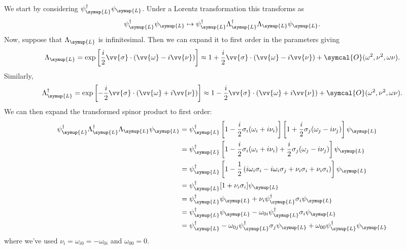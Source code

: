 \documentclass[fleqn]{NotesClass}
\newcommand{\hermit}{\dagger}
\newcommand{\order}{\symcal{O}}
\newcommand{\Left}{\symup{L}}
\begin{document}
    We start by considering \(\psi_{\Left}^\hermit \psi_{\Left}\).
    Under a Lorentz transformation this transforms as
    \begin{equation}
        \psi_{\Left}^\hermit \psi_{\Left} \mapsto \psi_{\Left}^\hermit \Lambda_{\Left}^\hermit \Lambda_{\Left} \psi_{\Left}.
    \end{equation}
    Now, suppose that \(\Lambda_{\Left}\) is infinitesimal.
    Then we can expand it to first order in the parameters giving
    \begin{equation}
        \Lambda_{\Left} = \exp\left[ \frac{i}{2} \vv{\sigma} \cdot (\vv{\omega} - i\vv{\nu}) \right] \approx 1 + \frac{i}{2}\vv{\sigma} \cdot (\vv{\omega} - i \vv{\nu}) + \order(\omega^2, \nu^2, \omega\nu).
    \end{equation}
    Similarly,
    \begin{equation}
        \Lambda_{\Left}^\hermit = \exp\left[ -\frac{i}{2}\vv{\sigma} \cdot (\vv{\omega} + i \vv{\nu}) \right] \approx 1 - \frac{i}{2} \vv{\sigma} \cdot (\vv{\omega} + i \vv{\nu}) + \order(\omega^2, \nu^2, \omega\nu).
    \end{equation}
    We can then expand the transformed spinor product to first order:
    \begin{align}
        \psi_{\Left}^\hermit\Lambda_{\Left}^\hermit \Lambda_{\Left}\psi_{\Left} &= \psi_{\Left}^\hermit \left[ 1 - \frac{i}{2} \sigma_i(\omega_i + i\nu_i) \right] \left[ 1 + \frac{i}{2} \sigma_j(\omega_j - i\nu_j) \right] \psi_{\Left}\\
        &= \psi_{\Left}^\hermit \left[ 1 - \frac{i}{2} \sigma_i (\omega_i + i\nu_i) + \frac{i}{2} \sigma_j (\omega_j - i\nu_j) \right] \psi_{\Left}\\
        &= \psi_{\Left}^\hermit \left[ 1 - \frac{1}{2}\left( i\omega_i\sigma_i - i\omega_i\sigma_j + \nu_i\sigma_i + \nu_i\sigma_i \right) \right] \psi_{\Left}\\
        &= \psi_{\Left}^\hermit [ 1 + \nu_i\sigma_i ] \psi_{\Left}\\
        &= \psi_{\Left}^\hermit \psi_{\Left} + \nu_i \psi_{\Left}^\hermit \sigma_i \psi_{\Left}\\
        &= \psi_{\Left}^\hermit \psi_{\Left} - \omega_{0i}\psi_{\Left}^\hermit\sigma_i\psi_{\Left}\\
        &= \psi_{\Left}^\hermit - \omega_{0j}\psi_{\Left}^\hermit\sigma_j\psi_{\Left} + \omega_{00}\psi_{\Left}^\hermit\psi_{\Left}
    \end{align}
    where we've used \(\nu_i = \omega_{i0} = -\omega_{0i}\) and \(\omega_{00} = 0\).
    
\end{document}
